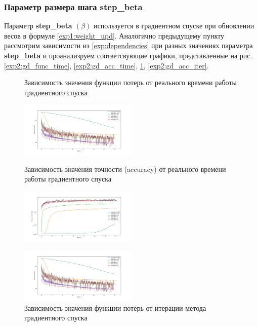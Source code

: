 \documentclass[a4paper, 11pt]{article}
\begin{document}
            \subsubsection{Параметр размера шага step\_beta}
                Параметр \textbf{step\_beta $(\beta)$} используется в градиентном спуске при обновлении весов в формуле \ref{exp1:weight_upd}.
                Аналогично предыдущему пункту рассмотрим зависимости из \ref{exp:dependencies} при разных значениях параметра \textbf{step\_beta} и проанализруем соответсвующие графики, представленные на рис. \ref{exp2:gd_func_time}, \ref{exp2:gd_acc_time}, \ref{exp2:gd_func_iter}, \ref{exp2:gd_acc_iter}.
                
                
                \begin{figure}[H] \label{exp1}
                    \begin{multicols}{2}
                        \begin{center}
                            \caption{Зависимость значения функции потерь от реального времени работы градиентного спуска} \label{exp2:gd_func_time}
                            \includegraphics[width=0.5\textwidth, height=0.25\textheight]{../graphs/exp1_func_GD_alpha_time_beta=0,001.pdf}
                            
                            \caption{Зависимость значения точности (accuracy) от реального времени работы градиентного спуска} \label{exp2:gd_acc_time}
                            \includegraphics[width=0.5\textwidth, height=0.25\textheight]{../graphs/exp1_accuracy_GD_alpha_time_beta=0,001.pdf}
                            
                            \caption{Зависимость значения функции потерь от итерации метода градиентного спуска} \label{exp2:gd_func_iter}
                            \includegraphics[width=0.5\textwidth, height=0.25\textheight]{../graphs/exp1_func_GD_alpha_time_beta=0,001.pdf}
                            

\end{center}
\end{multicols}
\end{figure}
\end{document}
